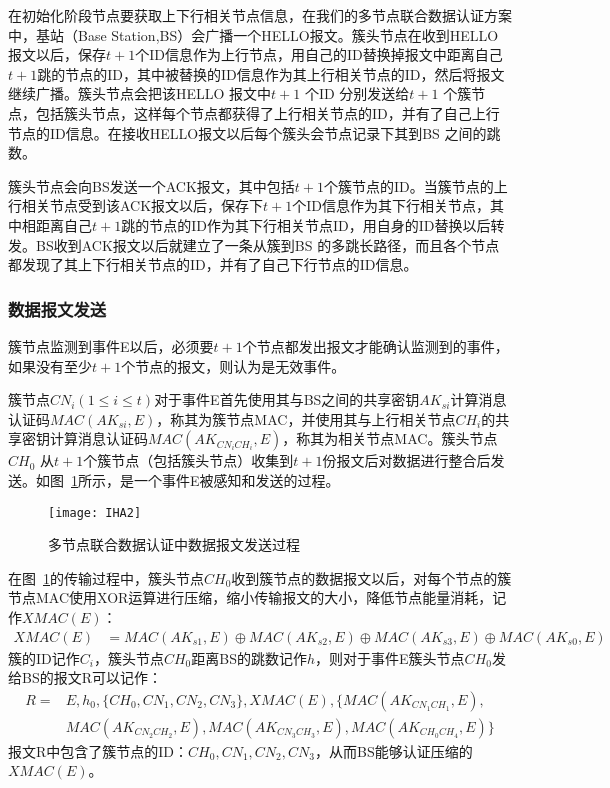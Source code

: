 在初始化阶段节点要获取上下行相关节点信息，在我们的多节点联合数据认证方案中，基站（Base Station,BS）会广播一个HELLO报文。簇头节点在收到HELLO 报文以后，保存$t+1$个ID信息作为上行节点，用自己的ID替换掉报文中距离自己$t+1$跳的节点的ID，其中被替换的ID信息作为其上行相关节点的ID，然后将报文继续广播。簇头节点会把该HELLO 报文中$t+1$ 个ID 分别发送给$t+1$ 个簇节点，包括簇头节点，这样每个节点都获得了上行相关节点的ID，并有了自己上行节点的ID信息。在接收HELLO报文以后每个簇头会节点记录下其到BS 之间的跳数。

簇头节点会向BS发送一个ACK报文，其中包括$t+1$个簇节点的ID。当簇节点的上行相关节点受到该ACK报文以后，保存下$t+1$个ID信息作为其下行相关节点，其中相距离自己$t+1$跳的节点的ID作为其下行相关节点ID，用自身的ID替换以后转发。BS收到ACK报文以后就建立了一条从簇到BS 的多跳长路径，而且各个节点都发现了其上下行相关节点的ID，并有了自己下行节点的ID信息。
\subsubsection{数据报文发送}
簇节点监测到事件E以后，必须要$t+1$个节点都发出报文才能确认监测到的事件，如果没有至少$t+1$个节点的报文，则认为是无效事件。

簇节点$CN_i(1\leq i\leq t)$对于事件E首先使用其与BS之间的共享密钥$AK_{si}$计算消息认证码$MAC(AK_{si},E)$，称其为簇节点MAC，并使用其与上行相关节点$CH_i$的共享密钥计算消息认证码$MAC(AK_{CN_i CH_i},E)$，称其为相关节点MAC。簇头节点$CH_0$ 从$t+1$个簇节点（包括簇头节点）收集到$t+1$份报文后对数据进行整合后发送。如图~\ref{fig:IHA2}所示，是一个事件E被感知和发送的过程。
\begin{figure}[htbp]
  \centering
  \texttt{[image: IHA2]}
  \caption{多节点联合数据认证中数据报文发送过程}
  \label{fig:IHA2}
\end{figure}

在图~\ref{fig:IHA2}的传输过程中，簇头节点$CH_0$收到簇节点的数据报文以后，对每个节点的簇节点MAC使用XOR运算进行压缩，缩小传输报文的大小，降低节点能量消耗，记作$XMAC(E)$：
\begin{equation}\label{XMAC}
\begin{split}
  XMAC(E)
  &=MAC(AK_{s1},E)\oplus MAC(AK_{s2},E)\oplus MAC(AK_{s3},E)\oplus MAC(AK_{s0},E)
\end{split}
\end{equation}
簇的ID记作$C_i$，簇头节点$CH_0$距离BS的跳数记作$h$，则对于事件E簇头节点$CH_0$发给BS的报文R可以记作：
\begin{equation}\label{report}
\begin{split}
  R=
  & E,h_0,\{CH_0,CN_1,CN_2,CN_3\},XMAC(E),\{MAC(AK_{CN_1 CH_1},E),\\
  & MAC(AK_{CN_2 CH_2},E),MAC(AK_{CN_3 CH_3},E),MAC(AK_{CH_0 CH_4},E)\}
\end{split}
\end{equation}
报文R中包含了簇节点的ID：$CH_0,CN_1,CN_2,CN_3$，从而BS能够认证压缩的$XMAC(E)$。

